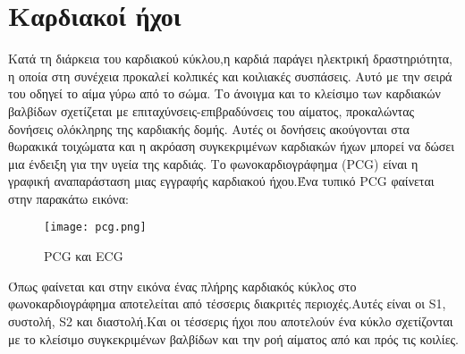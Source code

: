 \section{Καρδιακοί ήχοι}

Κατά τη διάρκεια του καρδιακού κύκλου,η καρδιά παράγει ηλεκτρική δραστηριότητα,
η οποία στη συνέχεια προκαλεί κολπικές και κοιλιακές συσπάσεις. Αυτό με την
σειρά του οδηγεί το αίμα γύρω από το σώμα. Το άνοιγμα και το κλείσιμο των
καρδιακών βαλβίδων σχετίζεται με επιταχύνσεις-επιβραδύνσεις του αίματος,
προκαλώντας δονήσεις ολόκληρης της καρδιακής δομής. Αυτές οι δονήσεις ακούγονται
στα θωρακικά τοιχώματα και η ακρόαση συγκεκριμένων καρδιακών ήχων μπορεί να
δώσει μια ένδειξη για την υγεία της καρδιάς. Το φωνοκαρδιογράφημα (PCG) είναι η
γραφική αναπαράσταση μιας εγγραφής καρδιακού ήχου.Ένα τυπικό PCG φαίνεται στην
παρακάτω εικόνα:

\begin{figure}[H]
	\texttt{[image: pcg.png]}
	\caption{PCG και ECG}
	\label{PCG}
\end{figure}

Όπως φαίνεται και στην εικόνα ένας πλήρης καρδιακός κύκλος στο φωνοκαρδιογράφημα
αποτελείται από τέσσερις διακριτές περιοχές.Αυτές είναι οι S1, συστολή, S2 και
διαστολή.Και οι τέσσερις ήχοι που αποτελούν ένα κύκλο σχετίζονται με το κλείσιμο
συγκεκριμένων βαλβίδων και την ροή αίματος από και πρός τις κοιλίες. \cite{physionet}
